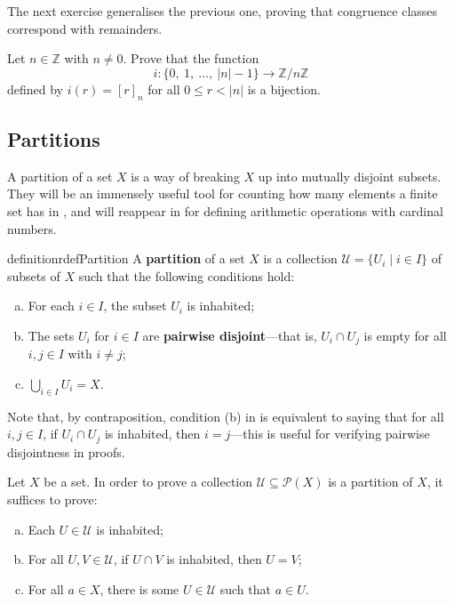 The next exercise generalises the previous one, proving that congruence classes correspond with remainders.

\begin{exercise}
\label{exCongruenceClassesCorrespondWithRemainders}
Let $n \in \mathbb{Z}$ with $n \ne 0$. Prove that the function
\[ i : \{ 0,~ 1,~ \dots,~ |n|-1 \} \to \mathbb{Z}/n\mathbb{Z} \]
defined by $i(r) = [r]_n$ for all $0 \le r < |n|$ is a bijection.
\end{exercise}

\subsection*{Partitions}

A partition of a set $X$ is a way of breaking $X$ up into mutually disjoint subsets. They will be an immensely useful tool for counting how many elements a finite set has in , and will reappear in  for defining arithmetic operations with cardinal numbers.

\begin{restatable}{definition}{rdefPartition}
\label{defPartition}
A \textbf{partition} of a set $X$ is a collection $\mathcal{U} = \{ U_i \mid i \in I \}$ of subsets of $X$ such that the following conditions hold:
\begin{enumerate}[(a)]
\item For each $i \in I$, the subset $U_i$ is inhabited;
\item The sets $U_i$ for $i \in I$ are \textbf{pairwise disjoint}---that is, $U_i \cap U_j$ is empty for all $i,j \in I$ with $i \ne j$;
\item $\bigcup_{i \in I} U_i = X$.
\end{enumerate}
\end{restatable}

Note that, by contraposition, condition (b) in  is equivalent to saying that for all $i,j \in I$, if $U_i \cap U_j$ is inhabited, then $i=j$---this is useful for verifying pairwise disjointness in proofs.

\begin{strategy}
\label{strProvingSubsetsFormPartition}
Let $X$ be a set. In order to prove a collection $\mathcal{U} \subseteq \mathcal{P}(X)$ is a partition of $X$, it suffices to prove:
\begin{enumerate}[(a)]
\item Each $U \in \mathcal{U}$ is inhabited;
\item For all $U, V \in \mathcal{U}$, if $U \cap V$ is inhabited, then $U=V$;
\item For all $a \in X$, there is some $U \in \mathcal{U}$ such that $a \in U$.
\end{enumerate}
\end{strategy}

